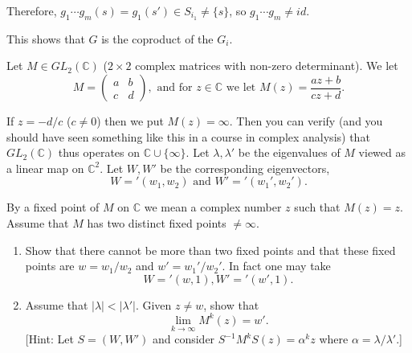 Therefore, $g_1 \cdots g_m(s) = g_1(s') \in S_{i_1} \neq \{s\}$, so $g_1 \cdots g_m \neq id$.

This shows that $G$ is the coproduct of the $G_i$.

\begin{problembox}
Let $M \in GL_2(\mathbb{C})$ ($2 \times 2$ complex matrices with non-zero determinant). We let
\[M = \begin{pmatrix}
a & b \\
c & d 
\end{pmatrix}, \text{ and for } z \in \mathbb{C} \text{ we let } M(z) = \frac{az + b}{cz + d}.\]

If $z = -d/c$ ($c \neq 0$) then we put $M(z) = \infty$. Then you can verify (and you should have seen something like this in a course in complex analysis) that $GL_2(\mathbb{C})$ thus operates on $\mathbb{C} \cup \{\infty\}$. Let $\lambda, \lambda'$ be the eigenvalues of $M$ viewed as a linear map on $\mathbb{C}^2$. Let $W, W'$ be the corresponding eigenvectors,
\[W = '(w_1, w_2) \text{ and } W' = '(w_1', w_2').\]

By a fixed point of $M$ on $\mathbb{C}$ we mean a complex number $z$ such that $M(z) = z$. Assume that $M$ has two distinct fixed points $\neq \infty$.
\begin{enumerate}[label=(\alph*)]
\item Show that there cannot be more than two fixed points and that these fixed points are $w = w_1 / w_2$ and $w' = w_1' / w_2'$. In fact one may take
\[ W = '(w, 1), W' = '(w', 1). \]
\item Assume that $|\lambda| < |\lambda'|$. Given $z \neq w$, show that
\[ \lim_{k \to \infty} M^k(z) = w'. \]
[Hint: Let $S = (W, W')$ and consider $S^{-1}M^kS(z) = \alpha^kz$ where $\alpha = \lambda / \lambda'$.]
\end{enumerate}
\end{problembox}

